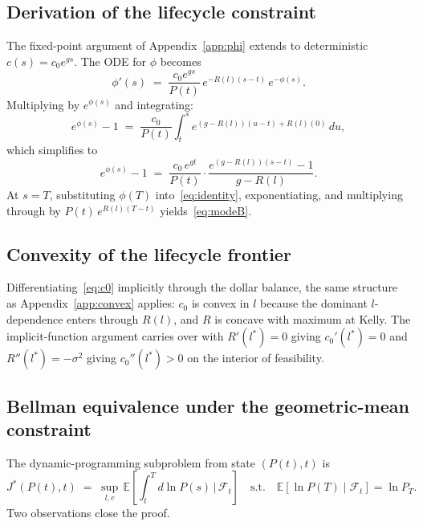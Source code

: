 \documentclass[11pt]{article}
\begin{document}
\subsection{Derivation of the lifecycle constraint}
\label{app:lifecycle}

The fixed-point argument of Appendix~\ref{app:phi} extends to
deterministic $c(s) = c_0 e^{gs}$. The ODE for $\phi$ becomes
\begin{equation}
  \phi'(s) \;=\; \frac{c_0 e^{gs}}{P(t)}\, e^{-R(l)(s - t)}\, e^{-\phi(s)}.
\end{equation}
Multiplying by $e^{\phi(s)}$ and integrating:
\begin{equation}
  e^{\phi(s)} - 1 \;=\; \frac{c_0}{P(t)}\int_t^s e^{(g - R(l))(u - t) + R(l)(0)}\, du,
\end{equation}
which simplifies to
\begin{equation}
  e^{\phi(s)} - 1 \;=\; \frac{c_0\, e^{gt}}{P(t)}\cdot \frac{e^{(g - R(l))(s - t)} - 1}{g - R(l)}.
\end{equation}
At $s = T$, substituting $\phi(T)$ into~\eqref{eq:identity},
exponentiating, and multiplying through by $P(t)\,e^{R(l)(T - t)}$
yields~\eqref{eq:modeB}.

\subsection{Convexity of the lifecycle frontier}
\label{app:lifecycle-convex}

Differentiating~\eqref{eq:c0} implicitly through the dollar balance,
the same structure as Appendix~\ref{app:convex} applies: $c_0$ is
convex in $l$ because the dominant $l$-dependence enters through
$R(l)$, and $R$ is concave with maximum at Kelly. The
implicit-function argument carries over with $R'(l^*) = 0$ giving
$c_0'(l^*) = 0$ and $R''(l^*) = -\sigma^2$ giving $c_0''(l^*) > 0$
on the interior of feasibility.

\subsection{Bellman equivalence under the geometric-mean constraint}
\label{app:bellman}

The dynamic-programming subproblem from state $(P(t), t)$ is
\begin{equation}
  J^*(P(t), t) \;=\; \sup_{l, c}\, \mathbb{E}\!\left[\int_t^T d\ln P(s) \,\Big|\, \mathcal{F}_t\right]
  \quad \text{s.t.} \quad \mathbb{E}[\ln P(T) \mid \mathcal{F}_t] = \ln P_T.
\end{equation}
Two observations close the proof.
\end{document}
